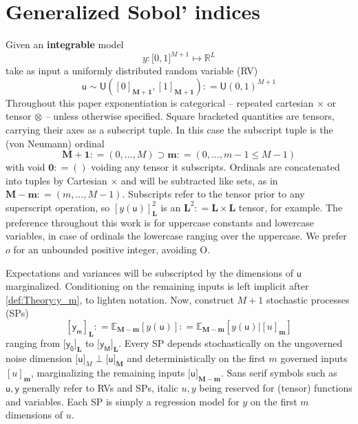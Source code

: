 \documentclass[preprint,12pt]{elsarticle}
\newcommand*{\M}[1]{\ensuremath{#1}\xspace}
\newcommand*{\x}{\times}
\newcommand*{\mi}[1]{\mathbf{#1}}
\newcommand*{\st}[1]{\mathbb{#1}}
\newcommand*{\rv}[1]{\mathsf{#1}}
\newcommand*{\te}[2][]{\left\lbrack{#2}\right\rbrack_{#1}}
\newcommand*{\tte}[2][]{\lbrack{#2}\rbrack_{#1}}
\newcommand*{\deq}{\M{\mathrel{\mathop:}=}}
\newcommand*{\ev}[3][]{\mathbb{E}_{#3}^{#1}\!\left\lbrack{#2}\right\rbrack}
\newcommand*{\uni}[2]{\mathsf{U}\!\left({#1,#2}\right)}
\newcommand*{\uniti}{\lbrack 0,1\rbrack}
\begin{document}
\section{Generalized Sobol' indices}\label{sec:GSI}
    Given an \textbf{integrable} model
    \begin{equation*}
        y \colon \uniti^{M+1} \mapsto \st{R}^{L}
    \end{equation*}
    take as input a uniformly distributed random variable (RV)
    \begin{equation*}
        \rv{u} \sim \uni{\te[\mi{M+1}]{0}}{\te[\mi{M+1}]{1}} \deq \uni{0}{1}^{M+1}
    \end{equation*}
    Throughout this paper exponentiation is categorical -- repeated cartesian $\x$ or tensor $\otimes$ -- unless otherwise specified. Square bracketed quantities are tensors, carrying their axes as a subscript tuple. In this case the subscript tuple is the (von Neumann) ordinal
    \begin{equation*}
        \mi{M+1} \deq (0,\ldots,M) \supset \mi{m} \deq (0,\ldots,m-1 \leq M-1)
    \end{equation*}
    with void $\mi{0}\deq ()$ voiding any tensor it subscripts. Ordinals are concatenated into tuples by Cartesian $\times$ and will be subtracted like sets, as in $\mi{M-m} \deq (m,\ldots,M-1)$. 
    Subscripts refer to the tensor prior to any superscript operation, so $\te[\mi{L}]{y(\rv{u})}^{2}$ is an $\mi{L}^{2} \deq \mi{L\x L}$ tensor, for example.
    The preference throughout this work is for uppercase constants and lowercase variables, in case of ordinals the lowercase ranging over the uppercase. We prefer $o$ for an unbounded positive integer, avoiding O.

    Expectations and variances will be subscripted by the dimensions of $\rv{u}$ marginalized. Conditioning on the remaining inputs is left implicit after \cref{def:Theory:y_m}, to lighten notation.
    Now, construct $M+1$ stochastic processes (SPs)
    \begin{equation}\label{def:Theory:y_m}
        \te[\mi{L}]{\rv{y_m}} \deq \ev{y(\rv{u})}{\mi{M-m}} \deq \ev{y(\rv{u}) \big\vert \te[\mi{m}]{u}}{\mi{M-m}}
    \end{equation}
    ranging from $\tte[\mi{L}]{\rv{y_0}}$ to $\tte[\mi{L}]{\rv{y_M}}$. Every SP depends stochastically on the ungoverned noise dimension $\tte[M]{\rv{u}} \perp \tte[\mi{M}]{\rv{u}}$ and deterministically on the first $m$ governed inputs $\te[\mi{m}]{u}$, marginalizing the remaining inputs $\tte[\mi{M-m}]{\rv{u}}$. 
    Sans serif symbols such as $\rv{u,y}$ generally refer to RVs and SPs, italic $u,y$ being reserved for (tensor) functions and variables. Each SP is simply a regression model for $y$ on the first $m$ dimensions of $u$.
    
\end{document}
